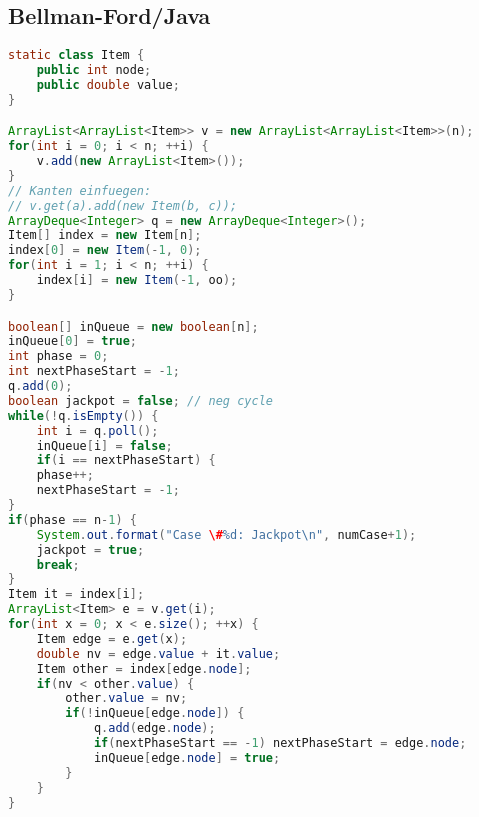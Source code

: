 \subsection{Bellman-Ford/Java}
\begin{lstlisting}[language=Java]
static class Item {
	public int node;
	public double value;
}

ArrayList<ArrayList<Item>> v = new ArrayList<ArrayList<Item>>(n);
for(int i = 0; i < n; ++i) {
	v.add(new ArrayList<Item>());
}
// Kanten einfuegen:
// v.get(a).add(new Item(b, c));
ArrayDeque<Integer> q = new ArrayDeque<Integer>();
Item[] index = new Item[n];
index[0] = new Item(-1, 0);
for(int i = 1; i < n; ++i) {
	index[i] = new Item(-1, oo);
}

boolean[] inQueue = new boolean[n];
inQueue[0] = true;
int phase = 0;
int nextPhaseStart = -1;
q.add(0);
boolean jackpot = false; // neg cycle
while(!q.isEmpty()) {
	int i = q.poll();
	inQueue[i] = false;
	if(i == nextPhaseStart) {
	phase++;
	nextPhaseStart = -1;
}
if(phase == n-1) {
	System.out.format("Case \#%d: Jackpot\n", numCase+1);
	jackpot = true;
	break;
}
Item it = index[i];
ArrayList<Item> e = v.get(i);
for(int x = 0; x < e.size(); ++x) {
	Item edge = e.get(x);
	double nv = edge.value + it.value;
	Item other = index[edge.node];
	if(nv < other.value) {
		other.value = nv;
		if(!inQueue[edge.node]) {
			q.add(edge.node);
			if(nextPhaseStart == -1) nextPhaseStart = edge.node;
			inQueue[edge.node] = true;
		}
	}
}
\end{lstlisting}